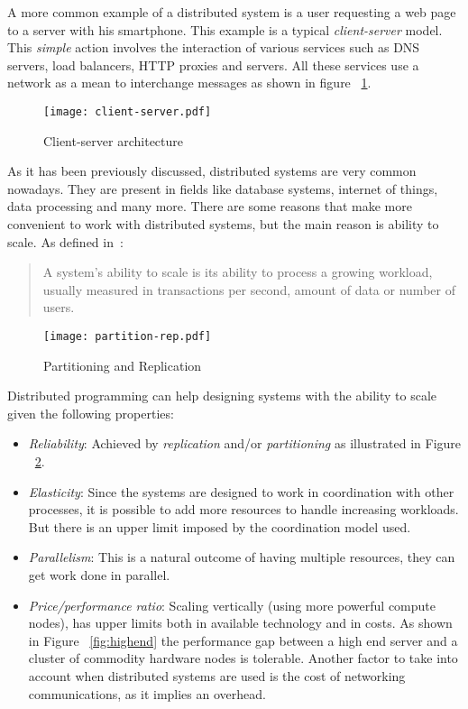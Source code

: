 A more common example of a distributed system is a user requesting a web page to
a server with his smartphone. This example is a typical \textit{client-server}
model. This \textit{simple} action involves the interaction of various services
such as DNS servers, load balancers, HTTP proxies and servers. All these
services use a network as a mean to interchange messages as shown in figure
~\ref{fig:client-server}.

\begin{figure}[!h]
\begin{center}
\texttt{[image: client-server.pdf]}
\caption{Client-server architecture}
\label{fig:client-server}
\end{center}
\end{figure}

As it has been previously discussed, distributed systems are very
common nowadays. They are present in fields like database systems,
internet of things, data processing and many more. There are some
reasons that make more convenient to work with distributed systems,
but the main reason is ability to scale. As defined
in~\cite{cloudadmin}:
%
\begin{quote}
  A system's ability to scale is its ability to process a growing workload,
  usually measured in transactions per second, amount of data or number of
  users.
\end{quote}

\begin{figure}[!h]
\begin{center}
\texttt{[image: partition-rep.pdf]}
\caption{Partitioning and Replication}
\label{fig:partitioning}
\end{center}
\end{figure}

Distributed programming can help designing systems with the ability to scale given
the following properties:
%
\begin{itemize}
\item \textit{Reliability}: Achieved by \textit{replication} and/or
  \textit{partitioning} as illustrated in Figure ~\ref{fig:partitioning}.
\item \textit{Elasticity}: Since the systems are designed to work in
  coordination with other processes, it is possible to add more resources to
  handle increasing workloads. But there is an upper limit imposed by the
  coordination model used.
\item \textit{Parallelism}: This is a natural outcome of having multiple resources, they
  can get work done in parallel.
\item \textit{Price/performance ratio}: Scaling vertically (using more powerful
  compute nodes), has upper limits both in available technology and in costs. As
  shown in Figure ~\ref{fig:highend} the performance gap between a high end
  server and a cluster of commodity hardware nodes is tolerable. Another factor
  to take into account when distributed systems are used is the cost of
  networking communications, as it implies an overhead.
\end{itemize}


